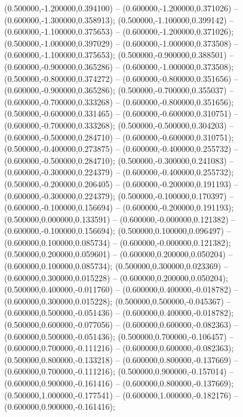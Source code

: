  (0.500000,-1.200000,0.394100) -- (0.600000,-1.200000,0.371026) -- (0.600000,-1.300000,0.358913);
 (0.500000,-1.100000,0.399142) -- (0.600000,-1.100000,0.375653) -- (0.600000,-1.200000,0.371026);
 (0.500000,-1.000000,0.397029) -- (0.600000,-1.000000,0.373508) -- (0.600000,-1.100000,0.375653);
 (0.500000,-0.900000,0.388501) -- (0.600000,-0.900000,0.365286) -- (0.600000,-1.000000,0.373508);
 (0.500000,-0.800000,0.374272) -- (0.600000,-0.800000,0.351656) -- (0.600000,-0.900000,0.365286);
 (0.500000,-0.700000,0.355037) -- (0.600000,-0.700000,0.333268) -- (0.600000,-0.800000,0.351656);
 (0.500000,-0.600000,0.331465) -- (0.600000,-0.600000,0.310751) -- (0.600000,-0.700000,0.333268);
 (0.500000,-0.500000,0.304203) -- (0.600000,-0.500000,0.284710) -- (0.600000,-0.600000,0.310751);
 (0.500000,-0.400000,0.273875) -- (0.600000,-0.400000,0.255732) -- (0.600000,-0.500000,0.284710);
 (0.500000,-0.300000,0.241083) -- (0.600000,-0.300000,0.224379) -- (0.600000,-0.400000,0.255732);
 (0.500000,-0.200000,0.206405) -- (0.600000,-0.200000,0.191193) -- (0.600000,-0.300000,0.224379);
 (0.500000,-0.100000,0.170397) -- (0.600000,-0.100000,0.156694) -- (0.600000,-0.200000,0.191193);
 (0.500000,0.000000,0.133591) -- (0.600000,-0.000000,0.121382) -- (0.600000,-0.100000,0.156694);
 (0.500000,0.100000,0.096497) -- (0.600000,0.100000,0.085734) -- (0.600000,-0.000000,0.121382);
 (0.500000,0.200000,0.059601) -- (0.600000,0.200000,0.050204) -- (0.600000,0.100000,0.085734);
 (0.500000,0.300000,0.023369) -- (0.600000,0.300000,0.015228) -- (0.600000,0.200000,0.050204);
 (0.500000,0.400000,-0.011760) -- (0.600000,0.400000,-0.018782) -- (0.600000,0.300000,0.015228);
 (0.500000,0.500000,-0.045367) -- (0.600000,0.500000,-0.051436) -- (0.600000,0.400000,-0.018782);
 (0.500000,0.600000,-0.077056) -- (0.600000,0.600000,-0.082363) -- (0.600000,0.500000,-0.051436);
 (0.500000,0.700000,-0.106457) -- (0.600000,0.700000,-0.111216) -- (0.600000,0.600000,-0.082363);
 (0.500000,0.800000,-0.133218) -- (0.600000,0.800000,-0.137669) -- (0.600000,0.700000,-0.111216);
 (0.500000,0.900000,-0.157014) -- (0.600000,0.900000,-0.161416) -- (0.600000,0.800000,-0.137669);
 (0.500000,1.000000,-0.177541) -- (0.600000,1.000000,-0.182176) -- (0.600000,0.900000,-0.161416);
